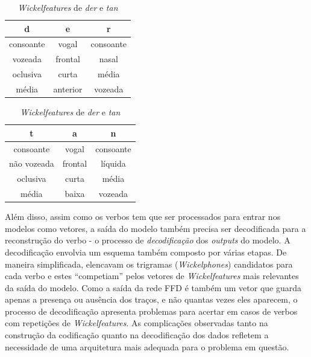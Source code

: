 \begin{table}[H]
    \begin{minipage}{.5\linewidth}
      \centering
      \caption{}
        \begin{tabular}{ccc}
        d                    & e                    & r                    \\ \hline
        consoante            & vogal                & consoante            \\
        vozeada               & frontal              & nasal             \\
        oclusiva                 & curta                & média                \\
        média               & anterior                  & vozeada\\
        \end{tabular}
        \label{tab:der}
    \end{minipage}%
    \begin{minipage}{.5\linewidth}
      \centering
        \caption{}

    \begin{tabular}{ccc}
    t                    & a                    & n                    \\ \hline
    consoante            & vogal                & consoante            \\
    não vozeada                & frontal              & líquida              \\
    oclusiva                 & curta                & média                \\
    média                & baixa                  & vozeada              \\

    \end{tabular}
    \label{tab:tan}
    \end{minipage} 
\caption{\textit{Wickelfeatures} de \textit{der} e \textit{tan}}
\label{tab:wickeldertan}
\end{table}

Além disso, assim como os verbos tem que ser processados para entrar nos modelos como vetores, a saída do modelo também precisa ser decodificada para a reconstrução do verbo -  o processo de \textit{decodificação} dos \textit{outputs} do modelo. A decodificação envolvia um esquema também composto por várias etapas. De maneira simplificada, \cite{rumelhart:1986} elencavam os trigramas (\textit{Wickelphones}) candidatos para cada verbo e estes “competiam” pelos vetores de \textit{Wickelfeatures} mais relevantes da saída do modelo. Como a saída da rede FFD é também um vetor que guarda apenas a presença ou ausência dos traços, e não quantas vezes eles aparecem, o processo de decodificação apresenta problemas para acertar em casos de verbos com repetições de \textit{Wickelfeatures}. As complicações observadas tanto na construção da codificação quanto na decodificação dos dados refletem a necessidade de uma arquitetura mais adequada para o problema em questão.

